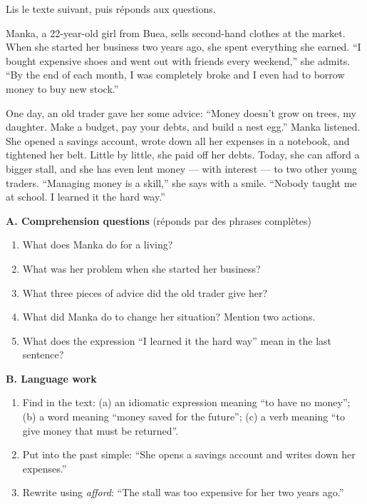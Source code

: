 \documentclass[11pt]{article}
\begin{document}
\begin{exercice}
Lis le texte suivant, puis réponds aux questions.
\begin{textebox}
Manka, a 22-year-old girl from Buea, sells second-hand clothes at the market. When she started her business two years ago, she spent everything she earned. “I bought expensive shoes and went out with friends every weekend,” she admits. “By the end of each month, I was completely broke and I even had to borrow money to buy new stock.”

One day, an old trader gave her some advice: “Money doesn't grow on trees, my daughter. Make a budget, pay your debts, and build a nest egg.” Manka listened. She opened a savings account, wrote down all her expenses in a notebook, and tightened her belt. Little by little, she paid off her debts. Today, she can afford a bigger stall, and she has even lent money — with interest — to two other young traders. “Managing money is a skill,” she says with a smile. “Nobody taught me at school. I learned it the hard way.”
\end{textebox}
\textbf{A. Comprehension questions} (réponds par des phrases complètes)
\begin{enumerate}
\item What does Manka do for a living?
\item What was her problem when she started her business?
\item What three pieces of advice did the old trader give her?
\item What did Manka do to change her situation? Mention two actions.
\item What does the expression “I learned it the hard way” mean in the last sentence?
\end{enumerate}
\textbf{B. Language work}
\begin{enumerate}
\item Find in the text: (a) an idiomatic expression meaning “to have no money”; (b) a word meaning “money saved for the future”; (c) a verb meaning “to give money that must be returned”.
\item Put into the past simple: “She opens a savings account and writes down her expenses.”
\item Rewrite using \emph{afford}: “The stall was too expensive for her two years ago.”
\end{enumerate}
\end{exercice}
\end{document}
